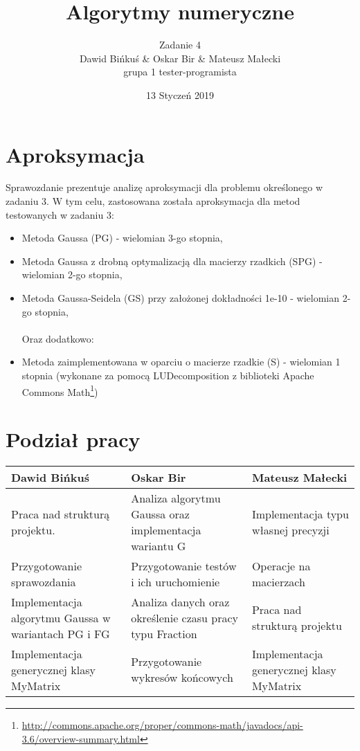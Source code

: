 \documentclass[10pt]{article}
\title{Algorytmy numeryczne}
\author{Zadanie 4 \\ Dawid Bińkuś \& Oskar Bir \& Mateusz Małecki\\grupa 1 tester-programista}
\date{13 Styczeń 2019}
\begin{document}
\maketitle 
\section{Aproksymacja}
Sprawozdanie prezentuje analizę aproksymacji dla problemu określonego w zadaniu 3.
W tym celu, zastosowana została aproksymacja dla metod testowanych w zadaniu 3:
\begin{itemize}
	\item Metoda Gaussa (PG) - wielomian 3-go stopnia,
	\item Metoda Gaussa z drobną optymalizacją dla macierzy rzadkich (SPG) - wielomian 2-go stopnia,
	\item Metoda Gaussa-Seidela (GS) przy założonej dokładności 1e-10 - wielomian 2-go stopnia,
	\\\\Oraz dodatkowo:
	\item Metoda zaimplementowana w oparciu o macierze rzadkie (S) - wielomian 1 stopnia (wykonane za pomocą LUDecomposition z biblioteki Apache Commons Math\footnote{\url{http://commons.apache.org/proper/commons-math/javadocs/api-3.6/overview-summary.html}})
\end{itemize}

\section{Podział pracy}
\centering
\begin{tabular}{| p{4.4cm} | p{4.4cm} | p{4.4cm} |}
	\hline
	\textbf{Dawid Bińkuś} & \textbf{Oskar Bir} & \textbf{Mateusz Małecki} \\ \hline
	Praca nad strukturą projektu. & Analiza algorytmu Gaussa oraz implementacja wariantu G & Implementacja typu własnej precyzji \\ \hline
	Przygotowanie sprawozdania & Przygotowanie testów i ich uruchomienie & Operacje na macierzach\\ \hline
	Implementacja algorytmu Gaussa w wariantach PG i FG & Analiza danych oraz określenie czasu pracy typu Fraction & Praca nad strukturą projektu \\ \hline
	Implementacja generycznej klasy MyMatrix & Przygotowanie wykresów końcowych & Implementacja generycznej klasy MyMatrix \\ \hline	
	\end{tabular}
\end{document}
